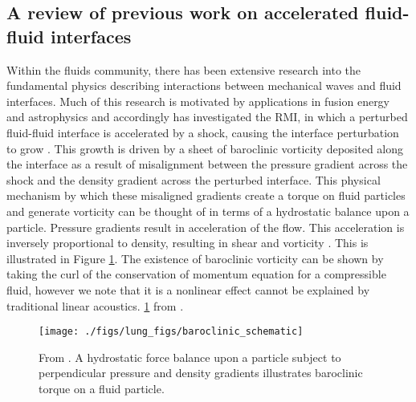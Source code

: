 \subsection{A review of previous work on accelerated fluid-fluid interfaces}
\label{subsec:usbe_lung_fluids_intro}
Within the fluids community, there has been extensive research into
the fundamental physics describing interactions between mechanical
waves and fluid interfaces. Much of this research is motivated by
applications in fusion energy and astrophysics and accordingly has
investigated the \ac{RMI}, in which a perturbed fluid-fluid interface
is accelerated by a shock, causing the interface perturbation to grow
\citep{Brouillette2002,Drake2006}. This growth is driven by a sheet of
baroclinic vorticity deposited along the interface as a result of
misalignment between the pressure gradient across the shock and the
density gradient across the perturbed interface. This physical
mechanism by which these misaligned gradients create a torque on fluid
particles and generate vorticity can be thought of in terms of a
hydrostatic balance upon a particle. Pressure gradients result in
acceleration of the flow. This acceleration is inversely proportional
to density, resulting in shear and vorticity \cite{Heifetz2015}. This
is illustrated in Figure \ref{fig:usbe_lung_baroclinic_schematic}.
The existence of baroclinic vorticity can be shown by taking the curl
of the conservation of momentum equation for a compressible fluid,
however we note that it is a nonlinear effect cannot be explained by
traditional linear acoustics.
\ref{fig:usbe_lung_baroclinic_schematic} from \cite{Heifetz2015}.
\begin{figure}
  \centering
  \texttt{[image: ./figs/lung\_figs/baroclinic\_schematic]} \hfill
 \caption[A schematic of baroclinic torque]{From
    \cite{Heifetz2015}. A hydrostatic force balance upon a particle
    subject to perpendicular pressure and density gradients
    illustrates baroclinic torque on a fluid particle.}
  \label{fig:usbe_lung_baroclinic_schematic}
\end{figure}

